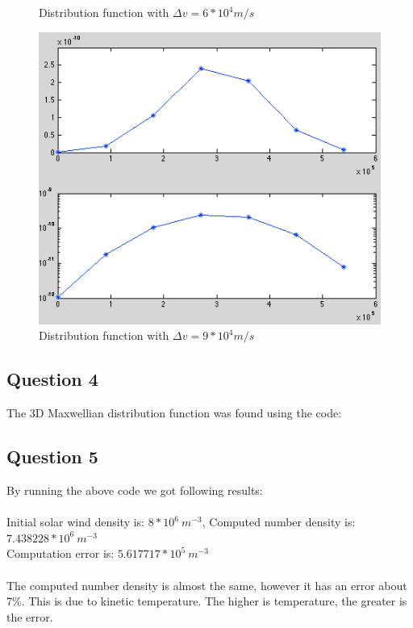 \documentclass{article}
\begin{document}
\begin{figure}[h!tb]
\begin{minipage}[b]{0.33\linewidth}
\caption{Distribution function with $\Delta v=6*10^4 m/s$}
\label{fig:plot32}
\end{minipage}
\begin{minipage}[b]{0.33\linewidth}
\centering
\includegraphics[width=\textwidth]{Figures/plot_33.png}
\caption{Distribution function with $\Delta v=9*10^4 m/s$}
\label{fig:plot33}
\end{minipage}
\end{figure}

\subsection{Question 4}

The 3D Maxwellian distribution function was found using the code:


\subsection{Question 5}
By running the above code we got following results:\\
\\
Initial solar wind density is: $8*10^6\:m^{-3}$, Computed number density is: $7.438228*10^6\:m^{-3}$ \\
Computation error is: $5.617717*10^5\:m^{-3}$\\
\\
The computed number density is almost the same, however it has an error about 7\%. This is due to kinetic temperature. The higher is temperature, the greater is the error.
\end{document}
